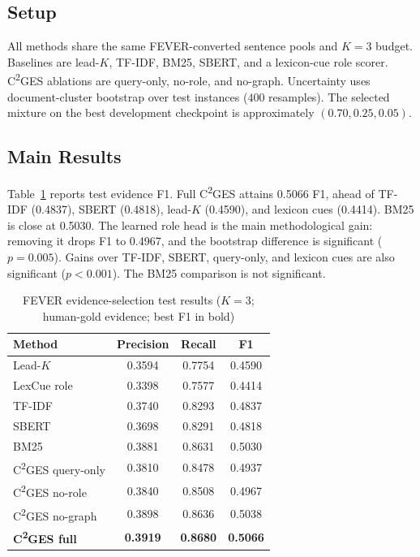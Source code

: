 \documentclass[cmc,article,submit,moreauthors,pdftex]{Definitions/tsp}
\newcommand{\cges}{C\textsuperscript{2}GES}
\begin{document}
\subsection{Setup}
All methods share the same FEVER-converted sentence pools and $K=3$ budget. Baselines are lead-$K$, TF-IDF, BM25, SBERT, and a lexicon-cue role scorer. \cges{} ablations are query-only, no-role, and no-graph. Uncertainty uses document-cluster bootstrap over test instances ($400$ resamples). The selected mixture on the best development checkpoint is approximately $(0.70,0.25,0.05)$.

\subsection{Main Results}
Table~\ref{tab:main} reports test evidence F1. Full \cges{} attains 0.5066 F1, ahead of TF-IDF (0.4837), SBERT (0.4818), lead-$K$ (0.4590), and lexicon cues (0.4414). BM25 is close at 0.5030. The learned role head is the main methodological gain: removing it drops F1 to 0.4967, and the bootstrap difference is significant ($p=0.005$). Gains over TF-IDF, SBERT, query-only, and lexicon cues are also significant ($p<0.001$). The BM25 comparison is not significant.

\begin{table}[!ht]
\centering
\caption{FEVER evidence-selection test results ($K=3$; human-gold evidence; best F1 in bold)}
\label{tab:main}
\begin{tabular}{lccc}
\toprule
Method & Precision & Recall & F1 \\
\midrule
Lead-$K$ & 0.3594 & 0.7754 & 0.4590 \\
LexCue role & 0.3398 & 0.7577 & 0.4414 \\
TF-IDF & 0.3740 & 0.8293 & 0.4837 \\
SBERT & 0.3698 & 0.8291 & 0.4818 \\
BM25 & 0.3881 & 0.8631 & 0.5030 \\
\cges{} query-only & 0.3810 & 0.8478 & 0.4937 \\
\cges{} no-role & 0.3840 & 0.8508 & 0.4967 \\
\cges{} no-graph & 0.3898 & 0.8636 & 0.5038 \\
\textbf{\cges{} full} & \textbf{0.3919} & \textbf{0.8680} & \textbf{0.5066} \\
\bottomrule
\end{tabular}
\end{table}
\end{document}
